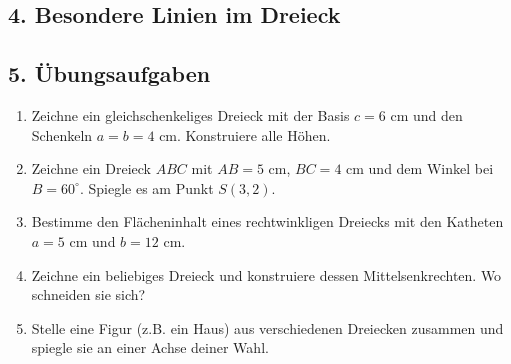 \subsection*{4. Besondere Linien im Dreieck}

\begin{center}
\end{center}

\subsection*{5. Übungsaufgaben}

\begin{enumerate}
  \item Zeichne ein gleichschenkeliges Dreieck mit der Basis $c = 6$ cm und den Schenkeln $a = b = 4$ cm. Konstruiere alle Höhen.
  
  \item Zeichne ein Dreieck $ABC$ mit $AB = 5$ cm, $BC = 4$ cm und dem Winkel bei $B = 60^\circ$. Spiegle es am Punkt $S(3,2)$.
  
  \item Bestimme den Flächeninhalt eines rechtwinkligen Dreiecks mit den Katheten $a = 5$ cm und $b = 12$ cm.
  
  \item Zeichne ein beliebiges Dreieck und konstruiere dessen Mittelsenkrechten. Wo schneiden sie sich?
  
  \item Stelle eine Figur (z.B. ein Haus) aus verschiedenen Dreiecken zusammen und spiegle sie an einer Achse deiner Wahl.
\end{enumerate}




